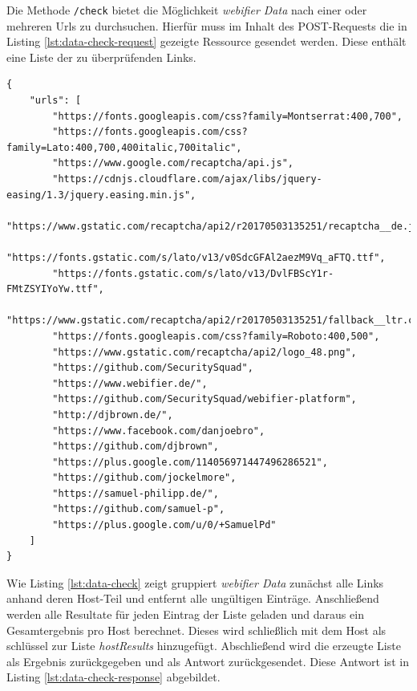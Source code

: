 Die Methode \lstinline[style=eclipse]{/check} bietet die Möglichkeit \textit{webifier Data} nach
einer oder mehreren Urls zu durchsuchen. Hierfür muss im Inhalt des POST-Requests die in Listing \ref{lst:data-check-request} gezeigte Ressource gesendet werden. Diese enthält eine Liste der zu überprüfenden Links.

\begin{scriptsize}
\begin{lstlisting}
{
    "urls": [
        "https://fonts.googleapis.com/css?family=Montserrat:400,700",
        "https://fonts.googleapis.com/css?family=Lato:400,700,400italic,700italic",
        "https://www.google.com/recaptcha/api.js",
        "https://cdnjs.cloudflare.com/ajax/libs/jquery-easing/1.3/jquery.easing.min.js",
        "https://www.gstatic.com/recaptcha/api2/r20170503135251/recaptcha__de.js",
        "https://fonts.gstatic.com/s/lato/v13/v0SdcGFAl2aezM9Vq_aFTQ.ttf",
        "https://fonts.gstatic.com/s/lato/v13/DvlFBScY1r-FMtZSYIYoYw.ttf",
        "https://www.gstatic.com/recaptcha/api2/r20170503135251/fallback__ltr.css",
        "https://fonts.googleapis.com/css?family=Roboto:400,500",
        "https://www.gstatic.com/recaptcha/api2/logo_48.png",
        "https://github.com/SecuritySquad",
        "https://www.webifier.de/",
        "https://github.com/SecuritySquad/webifier-platform",
        "http://djbrown.de/",
        "https://www.facebook.com/danjoebro",
        "https://github.com/djbrown",
        "https://plus.google.com/114056971447496286521",
        "https://github.com/jockelmore",
        "https://samuel-philipp.de/",
        "https://github.com/samuel-p",
        "https://plus.google.com/u/0/+SamuelPd"
    ]
}
\end{lstlisting}
\end{scriptsize}

Wie Listing \ref{lst:data-check} zeigt gruppiert \textit{webifier Data} zunächst alle Links anhand
deren Host-Teil und entfernt alle ungültigen Einträge. Anschließend werden alle Resultate für jeden Eintrag der Liste geladen und daraus ein Gesamtergebnis pro Host berechnet. Dieses wird schließlich mit dem Host als schlüssel zur Liste \textit{hostResults} hinzugefügt. Abschließend wird die erzeugte Liste als Ergebnis zurückgegeben und als Antwort zurückgesendet. Diese Antwort ist in Listing \ref{lst:data-check-response} abgebildet.

